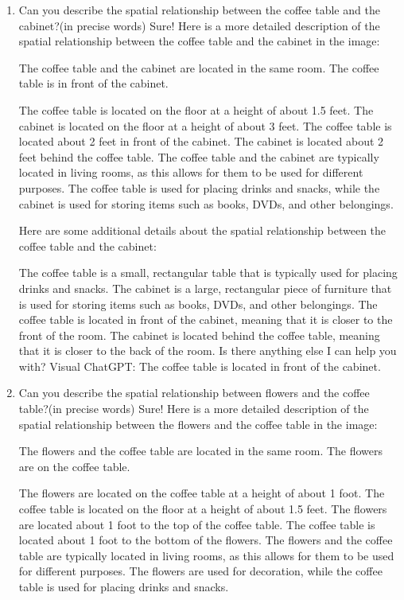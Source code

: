 \begin{enumerate}
    \item Can you describe the spatial relationship between the coffee table and the cabinet?(in precise words)
    \subitem 
    Sure! Here is a more detailed description of the spatial relationship between the coffee table and the cabinet in the image:
    
    The coffee table and the cabinet are located in the same room. The coffee table is in front of the cabinet.
    
    The coffee table is located on the floor at a height of about 1.5 feet.
    The cabinet is located on the floor at a height of about 3 feet.
    The coffee table is located about 2 feet in front of the cabinet.
    The cabinet is located about 2 feet behind the coffee table.
    The coffee table and the cabinet are typically located in living rooms, as this allows for them to be used for different purposes. The coffee table is used for placing drinks and snacks, while the cabinet is used for storing items such as books, DVDs, and other belongings.
    
    Here are some additional details about the spatial relationship between the coffee table and the cabinet:
    
    The coffee table is a small, rectangular table that is typically used for placing drinks and snacks.
    The cabinet is a large, rectangular piece of furniture that is used for storing items such as books, DVDs, and other belongings.
    The coffee table is located in front of the cabinet, meaning that it is closer to the front of the room.
    The cabinet is located behind the coffee table, meaning that it is closer to the back of the room.
    Is there anything else I can help you with?
    \subitem Visual ChatGPT: The coffee table is located in front of the cabinet.
    \item Can you describe the spatial relationship between flowers and the coffee table?(in precise words)
    \subitem Sure! Here is a more detailed description of the spatial relationship between the flowers and the coffee table in the image:

    The flowers and the coffee table are located in the same room. The flowers are on the coffee table.
    
    The flowers are located on the coffee table at a height of about 1 foot.
    The coffee table is located on the floor at a height of about 1.5 feet.
    The flowers are located about 1 foot to the top of the coffee table.
    The coffee table is located about 1 foot to the bottom of the flowers.
    The flowers and the coffee table are typically located in living rooms, as this allows for them to be used for different purposes. The flowers are used for decoration, while the coffee table is used for placing drinks and snacks.
    

\end{enumerate}
